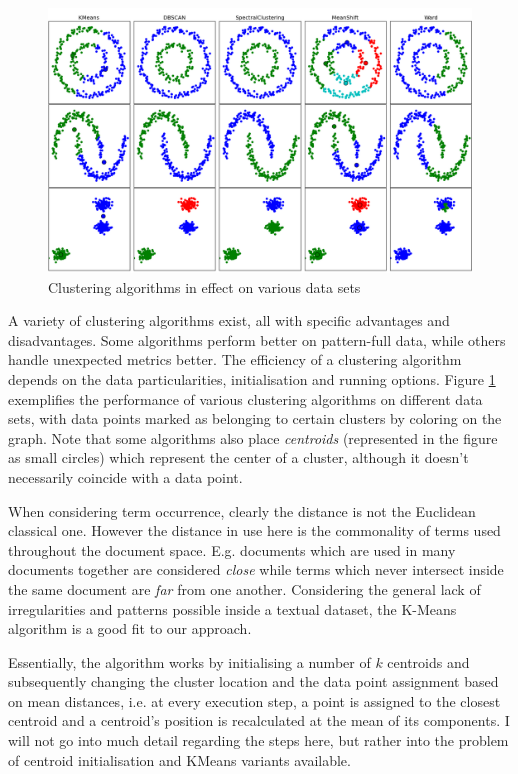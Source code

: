 \documentclass[12pt,a4paper,twoside]{report}
\begin{document}
\begin{figure}
    \centering
\includegraphics[width=\columnwidth]{img/clustering.png}
    \caption{Clustering algorithms in effect on various data sets}
    \label{fig:clustering}
\end{figure}

A variety of clustering algorithms exist, all with specific advantages and disadvantages. Some algorithms perform better on pattern-full data, while others handle unexpected metrics better. The efficiency of a clustering algorithm depends on the data particularities, initialisation and running options. Figure \ref{fig:clustering} exemplifies the performance of various clustering algorithms on different data sets, with data points marked as belonging to certain clusters by coloring on the graph. Note that some algorithms also place \emph{centroids} (represented in the figure as small circles) which represent the center of a cluster, although it doesn't necessarily coincide with a data point.

When considering term occurrence, clearly the distance is not the Euclidean classical one. However the distance in use here is the commonality of terms used throughout the document space. E.g. documents which are used in many documents together are considered \emph{close} while terms which never intersect inside the same document are \emph{far} from one another. Considering the general lack of irregularities and patterns possible inside a textual dataset, the K-Means algorithm is a good fit to our approach.

Essentially, the algorithm works by initialising a number of $k$ centroids and subsequently changing the cluster location and the data point assignment based on mean distances, i.e. at every execution step, a point is assigned to the closest centroid and a centroid's position is recalculated at the mean of its components. I will not go into much detail regarding the steps here, but rather into the problem of centroid initialisation and KMeans variants available.
\end{document}
